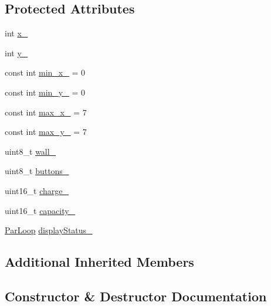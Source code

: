 \subsection*{Protected Attributes}
\begin{DoxyCompactItemize}
\item 
int \hyperlink{class_roomba_sense_h_a_t_a582d0e9fad099c1f7e0ba6a22567676e}{x\+\_\+}
\item 
int \hyperlink{class_roomba_sense_h_a_t_a3732a5d17f708fd18959beb0a4123d25}{y\+\_\+}
\item 
const int \hyperlink{class_roomba_sense_h_a_t_ae39e221ca1b6f9045a77d7befd66afe5}{min\+\_\+x\+\_\+} = 0
\item 
const int \hyperlink{class_roomba_sense_h_a_t_a121e53dc84befcf387724db98aaacf67}{min\+\_\+y\+\_\+} = 0
\item 
const int \hyperlink{class_roomba_sense_h_a_t_a0e74b98418deef0045f13ec563839aaa}{max\+\_\+x\+\_\+} = 7
\item 
const int \hyperlink{class_roomba_sense_h_a_t_ac32eb5edac9e6863af30618d5c3201e7}{max\+\_\+y\+\_\+} = 7
\item 
uint8\+\_\+t \hyperlink{class_roomba_sense_h_a_t_a51d95cef9e8394e0d2a8585daf83fc16}{wall\+\_\+}
\item 
uint8\+\_\+t \hyperlink{class_roomba_sense_h_a_t_a991284bb1f848638f47db5a823b87ef1}{buttons\+\_\+}
\item 
uint16\+\_\+t \hyperlink{class_roomba_sense_h_a_t_a7a382afdb36d1d297ca1ebc7f984db4f}{charge\+\_\+}
\item 
uint16\+\_\+t \hyperlink{class_roomba_sense_h_a_t_a2ba6d89c04f016428a23d85deb3de442}{capacity\+\_\+}
\item 
\hyperlink{class_par_loop}{Par\+Loop} \hyperlink{class_roomba_sense_h_a_t_acae6b7d45762e2159a100f78ac2250ce}{display\+Status\+\_\+}
\end{DoxyCompactItemize}
\subsection*{Additional Inherited Members}


\subsection{Constructor \& Destructor Documentation}

